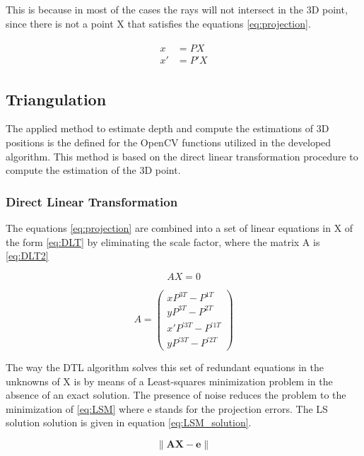 This is because in most of the cases the rays will not intersect in the 3D point, since there is not a point X that satisfies the equations \eqref{eq:projection}.

\begin{align}
\begin{split}
	x  &= P X\\
	x' &= P' X
	\label{eq:projection}
\end{split}
\end{align}

\subsection{Triangulation}
The applied method to estimate depth and compute the estimations of 3D positions is the defined for the OpenCV functions utilized in the developed algorithm.
This method is based on the direct linear transformation procedure to compute the estimation of the 3D point.

\subsubsection{Direct Linear Transformation}
The equations \eqref{eq:projection} are combined into a set of linear equations in X of the form \eqref{eq:DLT} by eliminating the scale factor, where the matrix A is \eqref{eq:DLT2}

\begin{equation}
	AX = 0
	\label{eq:DLT}
\end{equation}

\begin{equation}
A =
 \begin{pmatrix}
  xP^{3T} - P^{1T} \\
  yP^{3T} - P^{2T} \\
  x'P^{'3T} - P^{'1T} \\
  yP^{'3T} - P^{'2T}
 \end{pmatrix}
 \label{eq:DLT2}
\end{equation}

The way the DTL algorithm solves this set of redundant equations in the unknowns of X is by means of a Least-squares minimization problem in the absence of an exact solution.
The presence of noise reduces the problem to the minimization of \eqref{eq:LSM} where e stands for the projection errors.
The LS solution solution is given in equation \eqref{eq:LSM_solution}.

\begin{equation}
	\lVert \mathbf{AX-e} \rVert
	\label{eq:LSM}
\end{equation}

